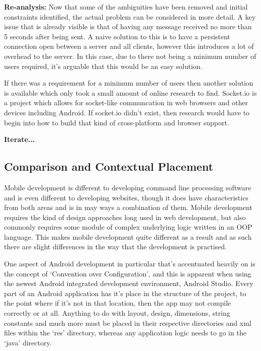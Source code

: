 \documentclass[11pt,english,numbers=endperiod,parskip=half]{scrartcl}
\begin{document}
    \textbf{Re-analysis:}
    Now that some of the ambiguities have been removed and initial constraints
    identified, the actual problem can be considered in more detail. A key issue
    that is already visible is that of having any message received no more than
    5 seconds after being sent. A naive solution to this is to have a persistent
    connection open between a server and all clients, however this introduces
    a lot of overhead to the server. In this case, due to there not being a
    minimum number of users required, it's arguable that this would be an easy
    solution.

    If there was a requirement for a minimum number of users then another
    solution is available which only took a small amount of online research to
    find. Socket.io is a project which allows for socket-like communcation in
    web browsers and other devices including Android. If socket.io didn't
    exist, then research would have to begin into how to build that kind of
    cross-platform and browser support.

    \textbf{Iterate...}

  \subsection{Comparison and Contextual Placement}
    Mobile development is different to developing command line processing
    software and is even different to developing websites, though it does have
    characteristics from both areas and is in may ways a combination of them.
    Mobile development requires the kind of design approaches long used in web
    development, but also commonly requires some module of complex underlying
    logic written in an OOP language. This makes mobile development quite different
    as a result and as such there are slight differences in the way that the
    development is practised.

    One aspect of Android development in particular that's accentuated heavily
    on is the concept of `Convention over Configuration', and this is apparent
    when using the newest Android integrated development environment, Android
    Studio. Every part of an Android application has it's place in the
    structure of the project, to the point where if it's not in that location,
    then the app may not compile correctly or at all. Anything to do with
    layout, design, dimensions, string constants and much more must be placed
    in their respective directories and xml files within the `res' directory,
    whereas any application logic needs to go in the `java' directory.
\end{document}
